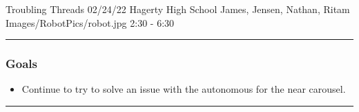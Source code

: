 \insertmeeting 
	{Troubling Threads} 
	{02/24/22} 
	{Hagerty High School}
	{James, Jensen, Nathan, Ritam}
	{Images/RobotPics/robot.jpg}
	{2:30 - 6:30}
	
\noindent\hfil\rule{\textwidth}{.4pt}\hfil
\subsubsection*{Goals}
\begin{itemize}
    \item Continue to try to solve an issue with the autonomous for the near carousel. 

\end{itemize} 

\noindent\hfil\rule{\textwidth}{.4pt}\hfil

